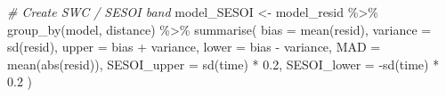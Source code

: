 \documentclass[fleqn,10pt,lineno]{wlpeerj} %
\newenvironment{Shaded}{\begin{snugshade}}{\end{snugshade}}
\newcommand{\AttributeTok}[1]{\textcolor[rgb]{0.77,0.63,0.00}{#1}}
\newcommand{\CommentTok}[1]{\textcolor[rgb]{0.56,0.35,0.01}{\textit{#1}}}
\newcommand{\FloatTok}[1]{\textcolor[rgb]{0.00,0.00,0.81}{#1}}
\newcommand{\FunctionTok}[1]{\textcolor[rgb]{0.00,0.00,0.00}{#1}}
\newcommand{\NormalTok}[1]{#1}
\newcommand{\OtherTok}[1]{\textcolor[rgb]{0.56,0.35,0.01}{#1}}
\newcommand{\SpecialCharTok}[1]{\textcolor[rgb]{0.00,0.00,0.00}{#1}}
\begin{document}
\begin{Shaded}
\begin{Highlighting}[]
\CommentTok{\# Create SWC / SESOI band}
\NormalTok{model\_SESOI }\OtherTok{\textless{}{-}}\NormalTok{ model\_resid }\SpecialCharTok{\%\textgreater{}\%}
  \FunctionTok{group\_by}\NormalTok{(model, distance) }\SpecialCharTok{\%\textgreater{}\%}
  \FunctionTok{summarise}\NormalTok{(}
    \AttributeTok{bias =} \FunctionTok{mean}\NormalTok{(resid),}
    \AttributeTok{variance =} \FunctionTok{sd}\NormalTok{(resid),}
    \AttributeTok{upper =}\NormalTok{ bias }\SpecialCharTok{+}\NormalTok{ variance,}
    \AttributeTok{lower =}\NormalTok{ bias }\SpecialCharTok{{-}}\NormalTok{ variance,}
    \AttributeTok{MAD =} \FunctionTok{mean}\NormalTok{(}\FunctionTok{abs}\NormalTok{(resid)),}
    \AttributeTok{SESOI\_upper =} \FunctionTok{sd}\NormalTok{(time) }\SpecialCharTok{*} \FloatTok{0.2}\NormalTok{,}
    \AttributeTok{SESOI\_lower =} \SpecialCharTok{{-}}\FunctionTok{sd}\NormalTok{(time) }\SpecialCharTok{*} \FloatTok{0.2}
\NormalTok{  )}


\end{Highlighting}
\end{Shaded}
\end{document}
